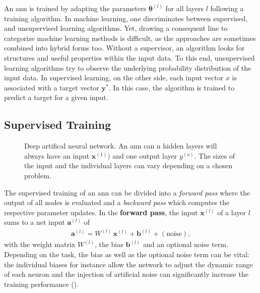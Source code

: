 An \gls{ann} is trained by adapting the parameters $\mathbf{\theta}^{(l)}$ for all layers $l$ following a training algorithm. In machine learning, one discriminates between supervised, and unsupervised learning algorithms. Yet, drawing a consequent line to categorize machine learning methods is difficult, as the approaches are sometimes combined into hybrid forms too. Without a supervisor, an algorithm looks for structures and useful properties within the input data. To this end, unsupervised learning algorithms try to observe the underlying probability distribution of the input data. In supervised learning, on the other side, each input vector $x$ is associated with a target vector $\textbf{y}^*$. In this case, the algorithm is trained to predict a target for a given input.




\subsection{Supervised Training}
\label{supervisedtraining}
\begin{figure}
	\centering
	
	\caption[Deep artifical neural network]{Deep artifical neural network. An \acrfull{ann} can n hidden layers will always have an input $\mathbf{x}^{(1)})$ and one output layer $y^{(o)}$. The sizes of the input and the individual layers can vary depending on a chosen problem.} 
	\label{multilayernetwork}
\end{figure}
The supervised training of an \gls{ann} can be divided into a \emph{forward pass} where the output of all nodes is evaluated and a \emph{backward pass} which computes the respective parameter updates. In the \textbf{forward pass}, the input $\mathbf{x}^{(l)}$ of a layer $l$ sums to a net input $\mathbf{a}^{(l)}$ of
\begin{align*}
\mathbf{a}^{(l)} = W^{(l)} \, \mathbf{x}^{(l)} + \mathbf{b}^{(l)} + \left(\text{noise}\right), 
\end{align*}
with the weight matrix $W^{(l)}$, the bias $\mathbf{b}^{(l)}$ and an optional noise term. Depending on the task, the bias as well as the optional noise term can be vital: the individual biases for instance allow the network to adjust the dynamic range of each neuron and the injection of artificial noise can significantly increase the training performance (\citealp{an1996effects}).

